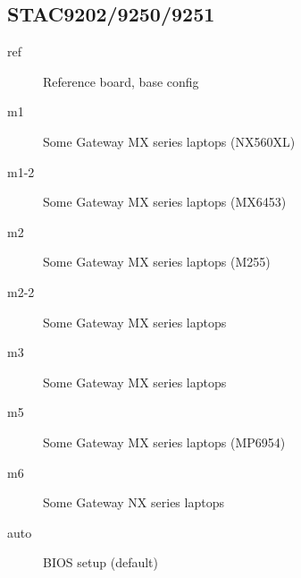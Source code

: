 \documentclass[a4paper,8pt,english]{sphinxmanual}
\begin{document}
\subsection{STAC9202/9250/9251}
\label{sound/hd-audio/models:stac9202-9250-9251}\begin{description}
\item[{ref}] \leavevmode
Reference board, base config

\item[{m1}] \leavevmode
Some Gateway MX series laptops (NX560XL)

\item[{m1-2}] \leavevmode
Some Gateway MX series laptops (MX6453)

\item[{m2}] \leavevmode
Some Gateway MX series laptops (M255)

\item[{m2-2}] \leavevmode
Some Gateway MX series laptops

\item[{m3}] \leavevmode
Some Gateway MX series laptops

\item[{m5}] \leavevmode
Some Gateway MX series laptops (MP6954)

\item[{m6}] \leavevmode
Some Gateway NX series laptops

\item[{auto}] \leavevmode
BIOS setup (default)

\end{description}
\end{document}
